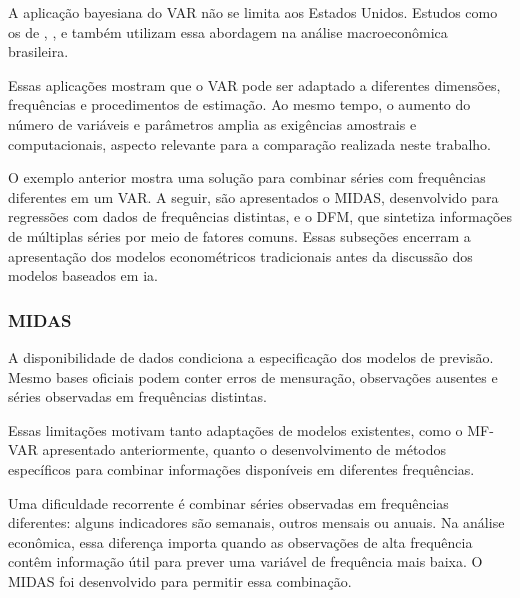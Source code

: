 A aplicação bayesiana do VAR não se limita aos Estados Unidos. Estudos como os de , ,  e  também utilizam essa abordagem na análise macroeconômica brasileira.

Essas aplicações mostram que o VAR pode ser adaptado a diferentes dimensões, frequências e procedimentos de estimação. Ao mesmo tempo, o aumento do número de variáveis e parâmetros amplia as exigências amostrais e computacionais, aspecto relevante para a comparação realizada neste trabalho.

O exemplo anterior mostra uma solução para combinar séries com frequências diferentes em um VAR. A seguir, são apresentados o MIDAS, desenvolvido para regressões com dados de frequências distintas, e o DFM, que sintetiza informações de múltiplas séries por meio de fatores comuns. Essas subseções encerram a apresentação dos modelos econométricos tradicionais antes da discussão dos modelos baseados em \ac{ia}.

 
 

%

\subsubsection{MIDAS}

A disponibilidade de dados condiciona a especificação dos modelos de previsão. Mesmo bases oficiais podem conter erros de mensuração, observações ausentes e séries observadas em frequências distintas.

Essas limitações motivam tanto adaptações de modelos existentes, como o MF-VAR apresentado anteriormente, quanto o desenvolvimento de métodos específicos para combinar informações disponíveis em diferentes frequências.

Uma dificuldade recorrente é combinar séries observadas em frequências diferentes: alguns indicadores são semanais, outros mensais ou anuais. Na análise econômica, essa diferença importa quando as observações de alta frequência contêm informação útil para prever uma variável de frequência mais baixa. O MIDAS foi desenvolvido para permitir essa combinação.

